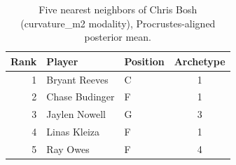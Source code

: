\begin{table}[htbp]
  \centering\small
  \begin{tabular}{rllc}
    \toprule
    Rank & Player & Position & Archetype \\
    \midrule
    1 & Bryant Reeves & C & 1 \\
    2 & Chase Budinger & F & 1 \\
    3 & Jaylen Nowell & G & 3 \\
    4 & Linas Kleiza & F & 1 \\
    5 & Ray Owes & F & 4 \\
    \bottomrule
  \end{tabular}
  \caption{Five nearest neighbors of Chris Bosh (curvature_m2 modality), Procrustes-aligned posterior mean.}
  \label{tab:Chris_Bosh_neighbors_curvature_m2}
\end{table}

